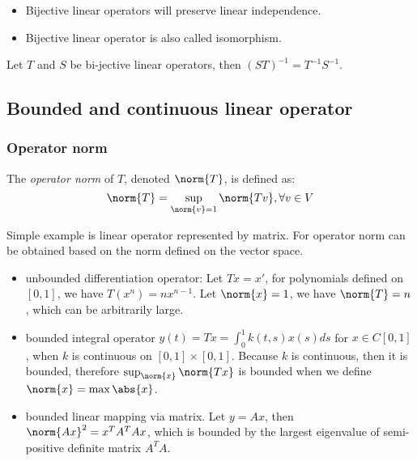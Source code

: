 \begin{refsection}
\begin{remark}\hfill
\begin{itemize}
    \item Bijective linear operators will preserve linear independence.
    \item Bijective linear operator is also called isomorphism. 
\end{itemize} 
\end{remark}

\begin{lemma}
Let $T$ and $S$ be bi-jective linear operators, then $(ST)^{-1} = T^{-1}S^{-1}$.
\end{lemma}


\subsection{Bounded and continuous linear operator}
\subsubsection{Operator norm}
\begin{definition}
The \emph{operator norm} of $T$, denoted $\norm{T}$, is defined as:
$$\norm{T} = \sup_{\norm{v}=1}\norm{Tv},\forall v\in V$$
\end{definition}
Simple example is linear operator represented by matrix. For operator norm can be obtained based on the norm defined on the vector space. 


\begin{example}\hfill
\begin{itemize}
    \item unbounded differentiation operator: Let $Tx=x'$, for polynomials defined on $[0,1]$, we have $T(x^n) = nx^{n-1}$. Let $\norm{x}=1$, we have $\norm{T} = n$, which can be arbitrarily large.
    \item bounded integral operator $y(t)=Tx=\int_0^1 k(t,s) x(s)ds$ for $x \in C[0,1]$, when $k$ is continuous on $[0,1]\times[0,1]$. Because $k$ is continuous, then it is bounded, therefore $\sup_{\norm{x}}\norm{Tx}$ is bounded when we define $\norm{x} = \max{\abs{x}}$.
    \item bounded linear mapping via matrix. Let $y=Ax$, then $\norm{Ax}^2 = x^TA^TAx$, which is bounded by the largest eigenvalue of semi-positive definite matrix $A^TA$.
\end{itemize}
\end{example}


\end{refsection}
